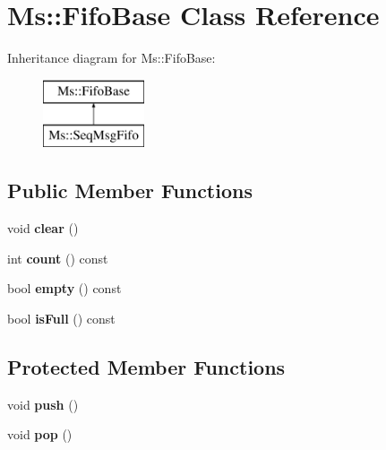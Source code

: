 \hypertarget{class_ms_1_1_fifo_base}{}\section{Ms\+:\+:Fifo\+Base Class Reference}
\label{class_ms_1_1_fifo_base}
Inheritance diagram for Ms\+:\+:Fifo\+Base\+:\begin{figure}[H]
\begin{center}
\leavevmode
\includegraphics[height=2.000000cm]{class_ms_1_1_fifo_base}
\end{center}
\end{figure}
\subsection*{Public Member Functions}
\begin{DoxyCompactItemize}
\item 
\mbox{\label{class_ms_1_1_fifo_base_a7f9caf2ef38327fb42170c5ed8a6bf1b}} 
void {\bfseries clear} ()
\item 
\mbox{\label{class_ms_1_1_fifo_base_af76781d918a7a01c6dda4ccf1a68af29}} 
int {\bfseries count} () const
\item 
\mbox{\label{class_ms_1_1_fifo_base_a20f1c4754b1b1db71456c56d36f4cbee}} 
bool {\bfseries empty} () const
\item 
\mbox{\label{class_ms_1_1_fifo_base_a8522006eac43a1e326f68a48a6a99db5}} 
bool {\bfseries is\+Full} () const
\end{DoxyCompactItemize}
\subsection*{Protected Member Functions}
\begin{DoxyCompactItemize}
\item 
\mbox{\label{class_ms_1_1_fifo_base_a25b04b0b812ce4d2c54965f66e4fd5df}} 
void {\bfseries push} ()
\item 
\mbox{\label{class_ms_1_1_fifo_base_a827801c8960d89e94b9740730af1a088}} 
void {\bfseries pop} ()
\end{DoxyCompactItemize}
